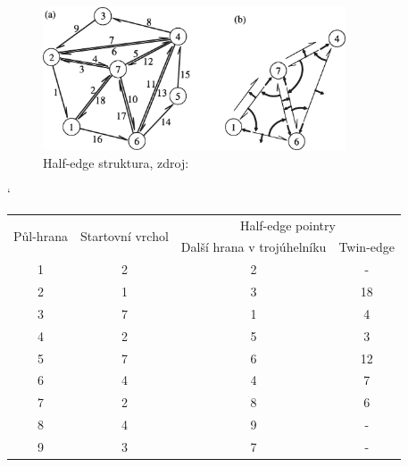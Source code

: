 \documentclass[12pt,a4paper]{article}
\begin{document}
{\newpage
\begin{figure}[h!]
\centering
\includegraphics[width=0.8\textwidth]{img/half_edge2.png}
\caption{Half-edge struktura, zdroj: \cite{triangulation}}
\label{fig:half_edge_scan}
\end{figure}
\begin{table}[h!]
\catcode`
\begin{tabular}{|c||c||c|c|}
\hline
\multirow{2}{*}{Půl-hrana} & \multirow{2}{*}{Startovní vrchol} & \multicolumn{2}{c|}{Half-edge pointry} \\ \cline{3-4} 
                           &                                   & Další hrana v trojúhelníku & Twin-edge \\ \hline
1                          & 2                                 & 2                          & -         \\ \hline
2                          & 1                                 & 3                          & 18        \\ \hline
3                          & 7                                 & 1                          & 4         \\ \hline
4                          & 2                                 & 5                          & 3         \\ \hline
5                          & 7                                 & 6                          & 12        \\ \hline
6                          & 4                                 & 4                          & 7         \\ \hline
7                          & 2                                 & 8                          & 6         \\ \hline
8                          & 4                                 & 9                          & -         \\ \hline
9                          & 3                                 & 7                          & -         \\ \hline

\end{tabular}
\end{table}}
\end{document}
